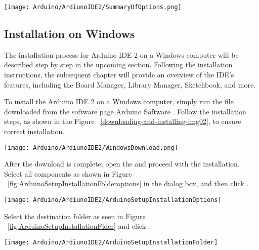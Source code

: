 \begin{center}\centering
	\texttt{[image: Arduino/ArdiunoIDE2/SummaryOfOptions.png]}
	\label{fig:Summary}		
\end{center}








\subsection{Installation on Windows}

The installation process for Arduino IDE 2 on a Windows computer will be described step by step in the upcoming section. Following the installation instructions, the subsequent chapter will provide an overview of the IDE's features, including the Board Manager, Library Manager, Sketchbook, and more.

To install the Arduino IDE 2 on a Windows computer, simply run the file downloaded from the software page Arduino Software . Follow the installation steps, as shown in the Figure ~\ref{downloading-and-installing-img02}, to ensure correct installation.


\begin{center}\centering
	\texttt{[image: Arduino/ArdiunoIDE2/WindowsDownload.png]}
	\label{fig:ArduinoIDECreatAgentInstallation}		
\end{center}




After the download is complete, open the  and proceed with the installation. Select all components as shown in Figure ~\ref{fig:ArduinoSetupInstallationFolderoptions} in the dialog box, and then click 
.


\begin{center}\centering
	\texttt{[image: Arduino/ArdiunoIDE2/ArduinoSetupInstallationOptions]}
	\label{fig:ArduinoSetupInstallationFolderoptions}		
\end{center}

Select the destination folder as seen in Figure ~\ref{fig:ArduinoSetupInstallationFlder} and click .

\begin{center}\centering
	\texttt{[image: Arduino/ArdiunoIDE2/ArduinoSetupInstallationFolder]}
	\label{fig:ArduinoSetupInstallationFlder}		
\end{center}

